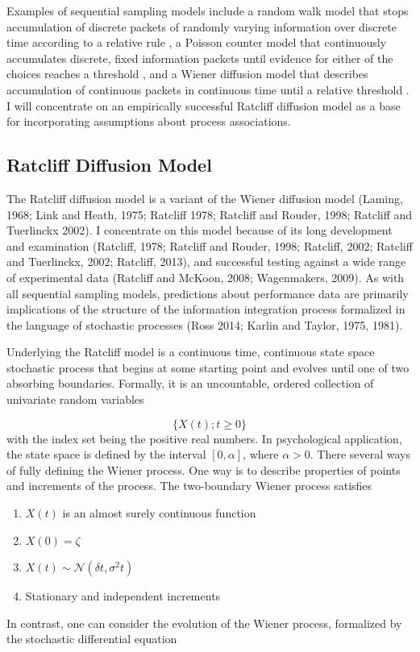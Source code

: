 \documentclass[12pt]{article}
\begin{document}
	Examples of sequential sampling models include a random walk model that stops accumulation of discrete packets of randomly varying information over discrete time according to a relative rule \citep{Lam1968}, a Poisson counter model that continuously accumulates discrete, fixed information packets until evidence for either of the choices reaches a threshold \citep{Lab1962}, and a Wiener diffusion model that describes accumulation of continuous packets in continuous time until a relative threshold \citep{Rat1978}. I will concentrate on an empirically successful Ratcliff diffusion model \citep{RatTue2002} as a base for incorporating assumptions about process associations. 
    
\subsection{Ratcliff Diffusion Model}
	The Ratcliff diffusion model is a variant of the Wiener diffusion model (Laming, 1968; Link and Heath, 1975; Ratcliff 1978; Ratcliff and Rouder, 1998; Ratcliff and Tuerlinckx 2002). I concentrate on this model because of its long development and examination (Ratcliff, 1978; Ratcliff and Rouder, 1998; Ratcliff, 2002; Ratcliff and Tuerlinckx, 2002; Ratcliff, 2013), and successful testing against a wide range of experimental data (Ratcliff and McKoon, 2008; Wagenmakers, 2009). As with all sequential sampling models, predictions about performance data are primarily implications of the structure of the information integration process formalized in the language of stochastic processes (Ross 2014; Karlin and Taylor, 1975, 1981).
    
	Underlying the Ratcliff model is a continuous time, continuous state space stochastic process that begins at some starting point and evolves until one of two absorbing boundaries. Formally, it is an uncountable, ordered collection of univariate random variables
    
\begin{equation}
\{X(t); t \geq 0\}
\end{equation}
with the index set being the positive real numbers. In psychological application, the state space is defined by the interval $[0, \alpha]$, where $\alpha > 0$. There several ways of fully defining the Wiener process. One way is to describe properties of points and increments of the process. The two-boundary Wiener process satisfies
\begin{enumerate}
\item $X(t)$ is an almost surely continuous function
\item $X(0) = \zeta$
\item $X(t) \sim \mathcal{N}(\delta t, \sigma^2 t)$
\item Stationary and independent increments
\end{enumerate}
In contrast, one can consider the evolution of the Wiener process, formalized by the stochastic differential equation
\end{document}
